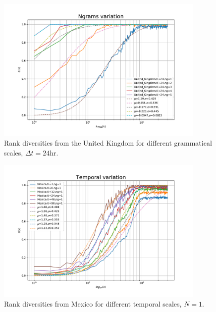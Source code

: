 \documentclass[12pt]{article}
\begin{document}
\begin{figure}[htbp]
\begin{center}
\includegraphics[width=0.9\textwidth]{img/N-United_Kingdom}
\caption{Rank diversities from the United Kingdom for different grammatical scales, $\Delta t = 24$hr.}
\label{fig:N-United_Kingdom}
\end{center}
\end{figure}

\begin{figure}[htbp]
\begin{center}
\includegraphics[width=0.9\textwidth]{img/time-Mexico}
\caption{Rank diversities from Mexico for different temporal scales, $N = 1$.}
\label{fig:time-Mexico}
\end{center}
\end{figure}
\end{document}
